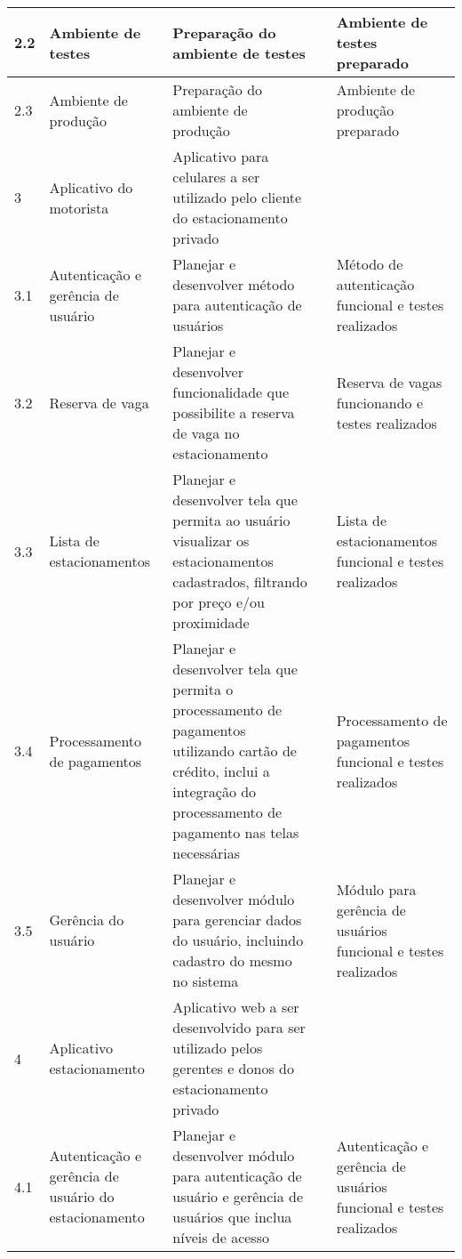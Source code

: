 \begin{longtable}{ l  p{}  p{}  l  p{}  }
		\midrule
		2.2         & Ambiente de testes                                        & Preparação do ambiente de testes &                   & Ambiente de testes preparado \\*
		\midrule
		2.3         & Ambiente de produção                                    & Preparação do ambiente de produção &                   & Ambiente de produção preparado \\*
		\midrule
		3           & Aplicativo do motorista                                   & Aplicativo para celulares a ser utilizado pelo cliente do estacionamento privado & & \\*
		\midrule
		3.1         & Autenticação e gerência de usuário                    & Planejar e desenvolver método para autenticação de usuários &                   & Método de autenticação funcional e testes realizados \\*
		\midrule
		3.2         & Reserva de vaga                                           & Planejar e desenvolver funcionalidade que possibilite a reserva de vaga no estacionamento &                   & Reserva de vagas funcionando e testes realizados \\*
		\midrule
		3.3         & Lista de estacionamentos                                  & Planejar e desenvolver tela que permita ao usuário visualizar os estacionamentos cadastrados, filtrando por preço e/ou proximidade &  & Lista de estacionamentos funcional e testes realizados \\*
		\midrule
		3.4         & Processamento de pagamentos                               & Planejar e desenvolver tela que permita o processamento de pagamentos utilizando cartão de crédito, inclui a integração do processamento de pagamento nas telas necessárias &                   & Processamento de pagamentos funcional e testes realizados \\*
		\midrule
		3.5         & Gerência do usuário                                     & Planejar e desenvolver módulo para gerenciar dados do usuário, incluindo cadastro do mesmo no sistema &                   & Módulo para gerência de usuários funcional e testes realizados \\*
		\midrule
		4           & Aplicativo estacionamento                                 & Aplicativo web a ser desenvolvido para ser utilizado pelos gerentes e donos do estacionamento privado & & \\*
		\midrule
		4.1         & Autenticação e gerência de usuário do estacionamento  & Planejar e desenvolver módulo para autenticação de usuário e gerência de usuários que inclua níveis de acesso & & Autenticação e gerência de usuários funcional e testes realizados \\*

\end{longtable}
